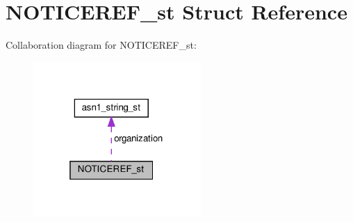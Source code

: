 \hypertarget{structNOTICEREF__st}{}\section{N\+O\+T\+I\+C\+E\+R\+E\+F\+\_\+st Struct Reference}
\label{structNOTICEREF__st}


Collaboration diagram for N\+O\+T\+I\+C\+E\+R\+E\+F\+\_\+st\+:
\nopagebreak
\begin{figure}[H]
\begin{center}
\leavevmode
\includegraphics[width=181pt]{structNOTICEREF__st__coll__graph}
\end{center}
\end{figure}
